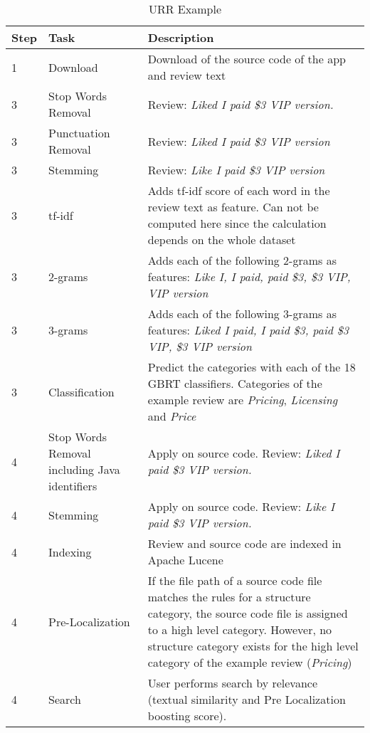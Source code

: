 \begin{table}
    \centering
    \caption{URR Example}
    \begin{tabular}{l|p{3cm}|p{9cm}} \hline
            Step  &  Task   &  Description \\ \hline\hline
        1     & Download & Download of the source code of the app and review text        \\ \hline
        3     & Stop Words Removal & Review: \textit{Liked I paid \$3 VIP version.}  \\ \hline
        3     & Punctuation Removal     & Review: \textit{Liked I paid \$3 VIP version}  \\ \hline
        3     & Stemming                & Review: \textit{Like I paid \$3 VIP version}  \\ \hline
        3     & tf-idf                  & Adds tf-idf score of each word in the review text as feature. Can not be computed here since the calculation depends on the whole dataset  \\ \hline
        3     & 2-grams & Adds each of the following 2-grams as features: \textit{Like I, I paid, paid \$3, \$3 VIP, VIP version}\\ \hline
        3     & 3-grams & Adds each of the following 3-grams as features: \textit{Liked I paid, I paid \$3, paid \$3 VIP, \$3 VIP version}\\ \hline
        3     & Classification & Predict the categories with each of the 18 GBRT classifiers. Categories of the example review are \textit{Pricing}, \textit{Licensing} and \textit{Price} \\ \hline
        4     & Stop Words Removal including Java identifiers & Apply on source code. Review: \textit{Liked I paid \$3 VIP version.} \\ \hline
        4     & Stemming & Apply on source code. Review: \textit{Like I paid \$3 VIP version.} \\ \hline
        4     & Indexing & Review and source code are indexed in Apache Lucene \\ \hline
        4     & Pre-Localization & If the file path of a source code file matches the rules for a structure category, the source code file is assigned to a high level category. However, no structure category exists for the high level category of the example review (\textit{Pricing})\\ \hline
        4     & Search & User performs search by relevance (textual similarity and Pre Localization boosting score).  \\ \hline
    \end{tabular}
    \label{tab:02_urr_example}
\end{table}

